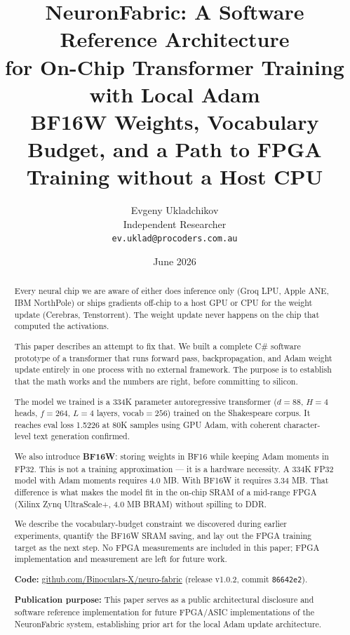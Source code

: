 \documentclass[11pt]{article}
\title{\textbf{NeuronFabric: A Software Reference Architecture\\
for On-Chip Transformer Training with Local Adam}\\[0.5em]
\large BF16W Weights, Vocabulary Budget, and a Path to FPGA Training without a Host CPU}
\author{
  Evgeny Ukladchikov \\
  Independent Researcher \\
  \texttt{ev.uklad@procoders.com.au} \\[0.3em]
  \small \href{\repourl}{\repourltext}
}
\date{June 2026}
\newcommand{\repourl}{https://github.com/Binoculars-X/neuro-fabric}
\newcommand{\repourltext}{github.com/Binoculars-X/neuro-fabric}
\begin{document}
\maketitle

\begin{abstract}

Every neural chip we are aware of either does inference only (Groq LPU, Apple ANE,
IBM NorthPole) or ships gradients off-chip to a host GPU or CPU for the weight update
(Cerebras, Tenstorrent). The weight update never happens on the chip that computed
the activations.

This paper describes an attempt to fix that. We built a complete C\# software prototype
of a transformer that runs forward pass, backpropagation, and Adam weight update
entirely in one process with no external framework. The purpose is to establish that
the math works and the numbers are right, before committing to silicon.

The model we trained is a 334K parameter autoregressive transformer
($d{=}88$, $H{=}4$ heads, $f{=}264$, $L{=}4$ layers, vocab$=256$) trained on the
Shakespeare corpus. It reaches eval loss 1.5226 at 80K samples using GPU Adam,
with coherent character-level text generation confirmed.

We also introduce \textbf{BF16W}: storing weights in BF16 while keeping Adam moments
in FP32. This is not a training approximation --- it is a hardware necessity.
A 334K FP32 model with Adam moments requires 4.0 MB. With BF16W it requires 3.34 MB.
That difference is what makes the model fit in the on-chip SRAM of a mid-range FPGA
(Xilinx Zynq UltraScale+, 4.0 MB BRAM) without spilling to DDR.

We describe the vocabulary-budget constraint we discovered during earlier experiments,
quantify the BF16W SRAM saving, and lay out the FPGA training target as the next step.
No FPGA measurements are included in this paper; FPGA implementation and measurement are left for future work.

\textbf{Code:} \href{\repourl}{\repourltext} (release v1.0.2, commit \texttt{86642e2}).

\textbf{Publication purpose:} This paper serves as a public architectural disclosure
and software reference implementation for future FPGA/ASIC implementations of the
NeuronFabric system, establishing prior art for the local Adam update architecture.

\end{abstract}
\end{document}
